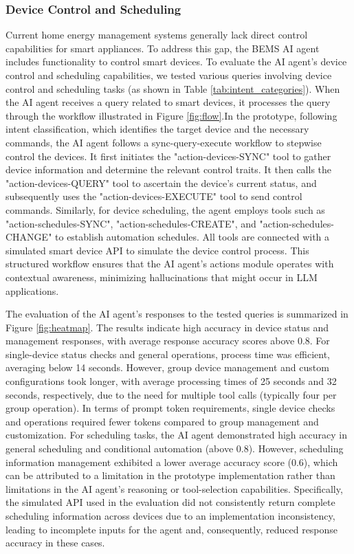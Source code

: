 \documentclass[final,3p,times]{elsarticle}
\begin{document}
\subsubsection{Device Control and Scheduling}

Current home energy management systems generally lack direct control capabilities for smart appliances. To address this gap, the BEMS AI agent includes functionality to control smart devices. To evaluate the AI agent’s device control and scheduling capabilities, we tested various queries involving device control and scheduling tasks (as shown in Table \ref{tab:intent_categories}). When the AI agent receives a query related to smart devices, it processes the query through the workflow illustrated in Figure \ref{fig:flow}.In the prototype, following intent classification, which identifies the target device and the necessary commands, the AI agent follows a sync-query-execute workflow to stepwise control the devices. It first initiates the "action-devices-SYNC" tool to gather device information and determine the relevant control traits. It then calls the "action-devices-QUERY" tool to ascertain the device’s current status, and subsequently uses the "action-devices-EXECUTE" tool to send control commands. Similarly, for device scheduling, the agent employs tools such as "action-schedules-SYNC", "action-schedules-CREATE", and "action-schedules-CHANGE" to establish automation schedules. All tools are connected with a simulated smart device API to simulate the device control process. This structured workflow ensures that the AI agent’s actions module operates with contextual awareness, minimizing hallucinations that might occur in LLM applications.

The evaluation of the AI agent’s responses to the tested queries is summarized in Figure \ref{fig:heatmap}. The results indicate high accuracy in device status and management responses, with average response accuracy scores above 0.8. For single-device status checks and general operations, process time was efficient, averaging below 14 seconds. However, group device management and custom configurations took longer, with average processing times of 25 seconds and 32 seconds, respectively, due to the need for multiple tool calls (typically four per group operation). In terms of prompt token requirements, single device checks and operations required fewer tokens compared to group management and customization. For scheduling tasks, the AI agent demonstrated high accuracy in general scheduling and conditional automation (above 0.8). However, scheduling information management exhibited a lower average accuracy score (0.6), which can be attributed to a limitation in the prototype implementation rather than limitations in the AI agent’s reasoning or tool-selection capabilities. Specifically, the simulated API used in the evaluation did not consistently return complete scheduling information across devices due to an implementation inconsistency, leading to incomplete inputs for the agent and, consequently, reduced response accuracy in these cases.
\end{document}
